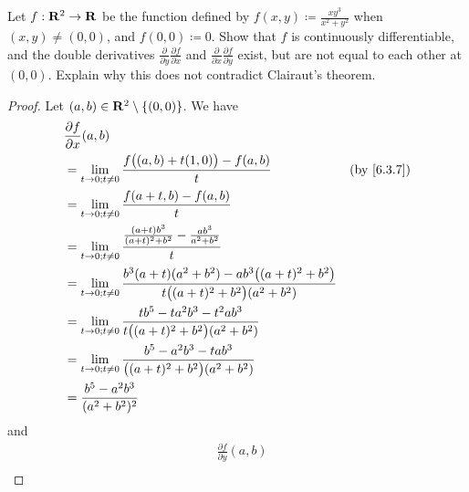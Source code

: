 \exercisesection

\begin{exercise}\label{ex 6.5.1}
  Let \(f : \mathbf{R}^2 \to \mathbf{R}\) be the function defined by \(f(x, y) \coloneqq \frac{x y^3}{x^2 + y^2}\) when \((x, y) \neq (0, 0)\), and \(f(0, 0) \coloneqq 0\).
  Show that \(f\) is continuously differentiable, and the double derivatives \(\frac{\partial}{\partial y} \frac{\partial f}{\partial x}\) and \(\frac{\partial}{\partial x} \frac{\partial f}{\partial y}\) exist, but are not equal to each other at \((0, 0)\).
  Explain why this does not contradict Clairaut's theorem.
\end{exercise}

\begin{proof}
  Let \((a, b) \in \mathbf{R}^2 \setminus \{(0, 0)\}\).
  We have
  \begin{align*}
     & \frac{\partial f}{\partial x}(a, b)                                                                                                                              \\
     & = \lim_{t \to 0 ; t \neq 0} \frac{f\big((a, b) + t(1, 0)\big) - f(a, b)}{t}                                                           & \text{(by \cref{6.3.7})} \\
     & = \lim_{t \to 0 ; t \neq 0} \frac{f(a + t, b) - f(a, b)}{t}                                                                                                      \\
     & = \lim_{t \to 0 ; t \neq 0} \frac{\frac{(a + t) b^3}{(a + t)^2 + b^2} - \frac{ab^3}{a^2 + b^2}}{t}                                                               \\
     & = \lim_{t \to 0 ; t \neq 0} \frac{b^3 (a + t) (a^2 + b^2) - a b^3 \big((a + t)^2 + b^2\big)}{t \big((a + t)^2 + b^2\big) (a^2 + b^2)}                            \\
     & = \lim_{t \to 0 ; t \neq 0} \frac{t b^5 - t a^2 b^3 - t^2 a b^3}{t \big((a + t)^2 + b^2\big) (a^2 + b^2)}                                                        \\
     & = \lim_{t \to 0 ; t \neq 0} \frac{b^5 - a^2 b^3 - t a b^3}{\big((a + t)^2 + b^2\big) (a^2 + b^2)}                                                                \\
     & = \frac{b^5 - a^2 b^3}{(a^2 + b^2)^2}
  \end{align*}
  and
  \begin{align*}
     & \frac{\partial f}{\partial y}(a, b)                                                                                                                                \\

\end{align*}
\end{proof}
